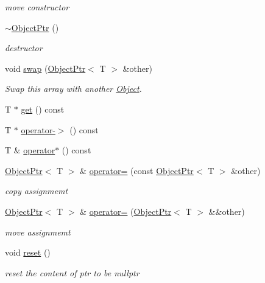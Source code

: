 \begin{DoxyCompactItemize}
\begin{DoxyCompactList}\small\item\em move constructor \end{DoxyCompactList}\item 
\hyperlink{classtvm_1_1runtime_1_1ObjectPtr_ac56d7fad8cbc348ad8ef0e7e23ee90e2}{$\sim$\+Object\+Ptr} ()
\begin{DoxyCompactList}\small\item\em destructor \end{DoxyCompactList}\item 
void \hyperlink{classtvm_1_1runtime_1_1ObjectPtr_a0306cc87b99ff5f392fdb90d6aabc70f}{swap} (\hyperlink{classtvm_1_1runtime_1_1ObjectPtr}{Object\+Ptr}$<$ T $>$ \&other)
\begin{DoxyCompactList}\small\item\em Swap this array with another \hyperlink{classtvm_1_1runtime_1_1Object}{Object}. \end{DoxyCompactList}\item 
T $\ast$ \hyperlink{classtvm_1_1runtime_1_1ObjectPtr_a1bd42b6c6b4e971414983d3d8f2b884f}{get} () const 
\item 
T $\ast$ \hyperlink{classtvm_1_1runtime_1_1ObjectPtr_a6e40337b5eff0d7629859b495af69361}{operator-\/$>$} () const 
\item 
T \& \hyperlink{classtvm_1_1runtime_1_1ObjectPtr_a7f055002c740996976657bdd448d9899}{operator$\ast$} () const 
\item 
\hyperlink{classtvm_1_1runtime_1_1ObjectPtr}{Object\+Ptr}$<$ T $>$ \& \hyperlink{classtvm_1_1runtime_1_1ObjectPtr_afda3c65f41e83e1c87145a216f8c846d}{operator=} (const \hyperlink{classtvm_1_1runtime_1_1ObjectPtr}{Object\+Ptr}$<$ T $>$ \&other)
\begin{DoxyCompactList}\small\item\em copy assignmemt \end{DoxyCompactList}\item 
\hyperlink{classtvm_1_1runtime_1_1ObjectPtr}{Object\+Ptr}$<$ T $>$ \& \hyperlink{classtvm_1_1runtime_1_1ObjectPtr_a4ea3532cb25b896b47b609c7db788bf8}{operator=} (\hyperlink{classtvm_1_1runtime_1_1ObjectPtr}{Object\+Ptr}$<$ T $>$ \&\&other)
\begin{DoxyCompactList}\small\item\em move assignmemt \end{DoxyCompactList}\item 
void \hyperlink{classtvm_1_1runtime_1_1ObjectPtr_ac4461465ba0e785794794e0405c96590}{reset} ()
\begin{DoxyCompactList}\small\item\em reset the content of ptr to be nullptr \end{DoxyCompactList}\item 

\end{DoxyCompactItemize}

